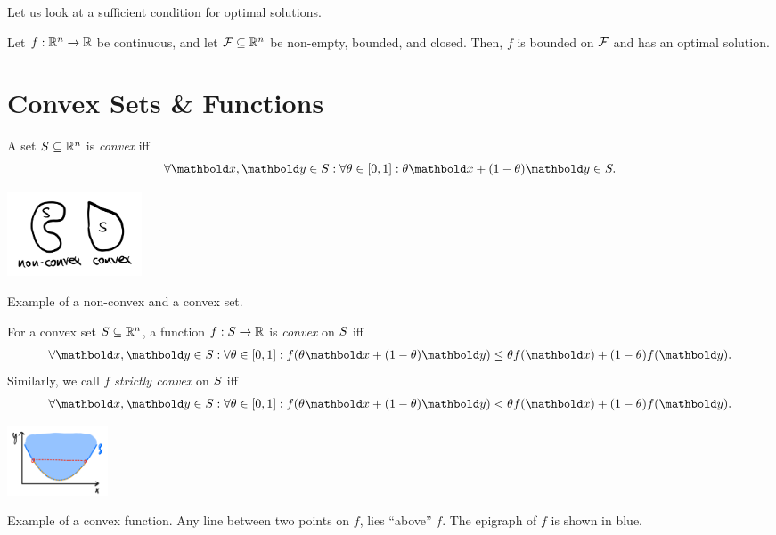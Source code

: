 Let us look at a sufficient condition for optimal solutions. \begin{thm}
Let $f : \mathbb{R}^n \to \mathbb{R}$ be continuous, and let $\mathcal{F} \subseteq \mathbb{R}^n$ be non-empty, bounded, and closed. Then, $f$ is bounded on $\mathcal{F}$ and has an optimal solution.
\end{thm}

\section{Convex Sets \& Functions}

\begin{defn} A set $S \subseteq \mathbb{R}^n$ is \emph{convex} iff \begin{align}
    \forall \vx, \vy \in \sS: \forall \theta \in [0,1]: \theta\vx + (1-\theta)\vy \in \sS.
\end{align}
\end{defn}
\begin{marginfigure}
\centering\includegraphics[width=4cm]{notes/figures/convex_set.png}
\caption{Example of a non-convex and a convex set.}
\end{marginfigure}
\begin{defn} For a convex set $S \subseteq \mathbb{R}^n$, a function $f : S \to \mathbb{R}$ is \emph{convex} on $S$ iff \begin{align}
    \forall \vx, \vy \in \sS: \forall \theta \in [0,1]: f(\theta\vx + (1-\theta)\vy) \leq \theta f(\vx) + (1-\theta) f(\vy).
\end{align} Similarly, we call $f$ \emph{strictly convex} on $S$ iff \begin{align}
    \forall \vx, \vy \in \sS: \forall \theta\in[0,1]: f(\theta\vx + (1-\theta)\vy) < \theta f(\vx) + (1-\theta) f(\vy).
\end{align}
\end{defn}
\begin{marginfigure}
\centering\includegraphics[width=3cm]{notes/figures/convex_function.png}
\caption{Example of a convex function. Any line between two points on $f$, lies ``above'' $f$. The epigraph of $f$ is shown in blue.}
\end{marginfigure}

